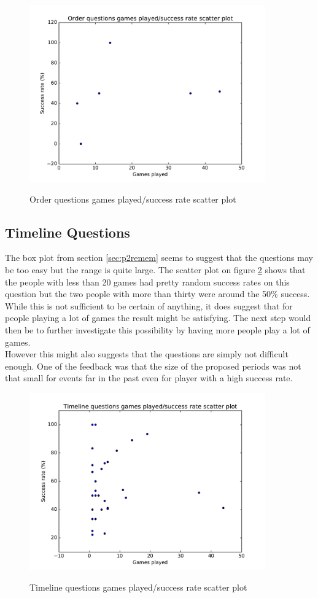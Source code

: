 \begin{figure}
\centering
{\includegraphics[width=4in]{images/order_scatter.pdf}}
\caption{Order questions games played/success rate scatter plot}
\label{fig:ordScatter}
\end{figure}

\subsection{Timeline Questions}
The box plot from section \ref{sec:p2remem} seems to suggest that the questions may be too easy but the range is quite large. The scatter plot on figure \ref{fig:timeScatter} shows that the people with less than 20 games had pretty random success rates on this question but the two people with more than thirty were around the 50\% success. While this is not sufficient to be certain of anything, it does suggest that for people playing a lot of games the result might be satisfying. The next step would then be to further investigate this possibility by having more people play a lot of games.\\
However this might also suggests that the questions are simply not difficult enough. One of the feedback was that the size of the proposed periods was not that small for events far in the past even for player with a high success rate.
\begin{figure}
\centering
{\includegraphics[width=4in]{images/timeline_scatter.pdf}}
\caption{Timeline questions games played/success rate scatter plot}
\label{fig:timeScatter}
\end{figure}

